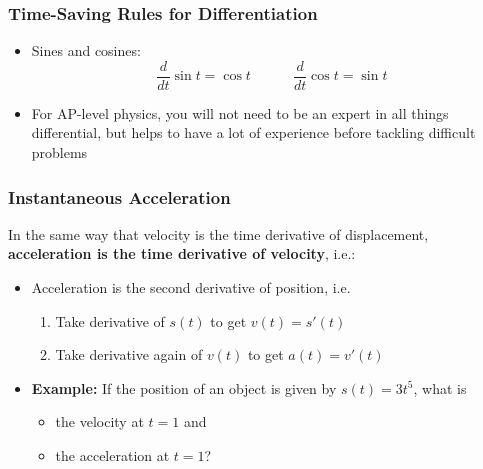 \documentclass[12pt,compress,aspectratio=169]{beamer}
\begin{document}
\begin{frame}
  \frametitle{Time-Saving Rules for Differentiation}
  \begin{itemize}
  \item Sines and cosines:
    {\large
      \begin{displaymath}
      \frac{d}{dt}\sin t = \cos t\quad\quad\quad
      \frac{d}{dt}\cos t = \sin t
      \end{displaymath}
    }
  \item For AP-level physics, you will not need to be an expert in all things
    differential, but helps to have a lot of experience before tackling
    difficult problems
  \end{itemize}
\end{frame}

\begin{frame}
  \frametitle{Instantaneous Acceleration}
  In the same way that velocity is the time derivative of displacement,
  \textbf{acceleration is the time derivative of velocity}, i.e.:

  \begin{itemize}
  \item Acceleration is the second derivative of position, i.e.
    \begin{enumerate}
    \item Take derivative of $s(t)$ to get $v(t)=s'(t)$
    \item Take derivative again of $v(t)$ to get $a(t)=v'(t)$
    \end{enumerate}
  \item<2->\textbf{Example:} If the position of an object is given by
    $\displaystyle s(t)=3t^5$, what is
    \begin{itemize}
    \item the velocity at $t=1$ and
    \item the acceleration at $t=1$?
    \end{itemize}
  \end{itemize}
\end{frame}
\end{document}
